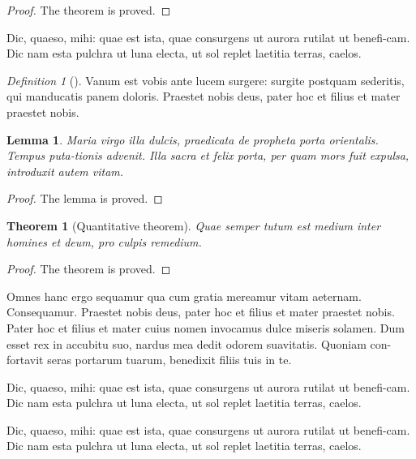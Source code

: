 \documentclass{nejsds}
\newtheorem{thm}{Theorem}
\newtheorem{lemma}{Lemma}
\theoremstyle{remark}
\newtheorem{defin}{Definition}
\begin{document}
\begin{proof}
The theorem is proved.
\end{proof}

Dic, quaeso, mihi: quae est ista, quae consurgens ut aurora rutilat
ut benefi-cam.  Dic nam esta pulchra ut luna electa, ut sol replet
laetitia terras, caelos.

\begin{defin}[\cite{powergrid1}]\label{clas}
Vanum est vobis ante lucem surgere: surgite postquam
sederitis, qui manducatis panem doloris. Praestet nobis deus, pater
hoc et filius et mater praestet nobis.
\end{defin}

\begin{lemma}
Maria virgo illa dulcis, praedicata de
propheta porta orientalis. Tempus puta-tionis advenit. Illa sacra et
felix porta, per quam mors fuit expulsa, introduxit autem vitam.
\end{lemma}

\begin{proof}
The lemma is proved.
\end{proof}

\begin{thm}[Quantitative theorem]
Quae semper tutum est medium inter homines et deum, pro culpis remedium.
\end{thm}

\begin{proof}
The theorem is proved.
\end{proof}

\begin{acknowledgement}[title={Acknowledgments}]
Omnes hanc ergo sequamur qua cum gratia mereamur vitam aeternam.
Consequamur. Praestet nobis deus, pater hoc et filius et mater
praestet nobis.  Pater hoc et filius et mater cuius nomen invocamus
dulce miseris solamen. Dum esset rex in accubitu suo, nardus mea
dedit odorem suavitatis. Quoniam con-fortavit seras portarum tuarum,
benedixit filiis tuis in te.
\end{acknowledgement}

\begin{funding}
Dic, quaeso, mihi: quae est ista, quae consurgens ut aurora rutilat
ut benefi-cam.  Dic nam esta pulchra ut luna electa, ut sol replet
laetitia terras, caelos.

Dic, quaeso, mihi: quae est ista, quae consurgens ut aurora rutilat
ut benefi-cam.  Dic nam esta pulchra ut luna electa, ut sol replet
laetitia terras, caelos.
\end{funding}
\end{document}
